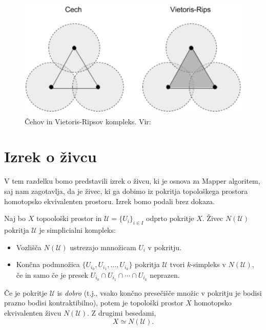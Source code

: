 \begin{figure}[H]
    \centering
    \includegraphics[width=0.7\linewidth]{resources/cech-vs-vietoris-rips-complex.png}
    \caption{Čehov in Vietoris-Ripsov kompleks. Vir: \cite{justinmath_persistent_homology}}
    \label{fig:backprop}
\end{figure}

\section{Izrek o živcu}
V tem razdelku bomo predstavili izrek o živcu, ki je osnova za Mapper algoritem, saj nam zagotavlja, da je živec, ki ga dobimo iz pokritja topološkega prostora homotopsko ekvivalenten prostoru. Izrek bomo podali brez dokaza. \cite{GuzeljBlatnik2020}

\begin{izrek}
Naj bo \( X \) topoološki prostor in \( \mathcal{U} = \{ U_i \}_{i \in I} \) odprto pokritje \( X \). Živec \( N(\mathcal{U}) \) pokritja \( \mathcal{U} \) je simplicialni kompleks:
\begin{itemize}
    \item Vozlišča \( N(\mathcal{U}) \) ustrezajo mnnožicam \( U_i \) v pokritju.
    \item Končna podmnožica \( \{ U_{i_0}, U_{i_1}, \ldots, U_{i_k} \} \) pokritja \( \mathcal{U} \) tvori \( k \)-simpleks v \( N(\mathcal{U}) \), če in samo če je presek \( U_{i_0} \cap U_{i_1} \cap \cdots \cap U_{i_k} \) neprazen.
\end{itemize}
Če je pokritje \( \mathcal{U} \) is \textit{dobro} (t.j., vsako končno presečišče množic v pokritju je bodisi prazno bodisi kontraktibilno), potem je topološki prostor \( X \) homotopsko ekvivalenten živcu \( N(\mathcal{U}) \). Z drugimi besedami,
\[ X \simeq N(\mathcal{U}). \]
\end{izrek}